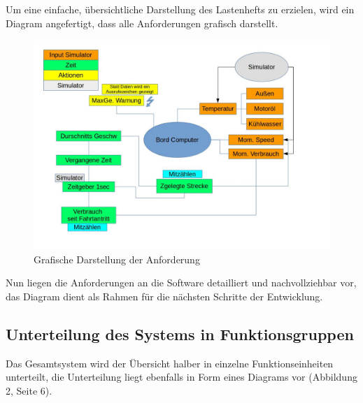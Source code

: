 \documentclass[a4paper,12pt]{article}
\begin{document}
Um eine einfache, übersichtliche Darstellung des Lastenhefts zu erzielen, wird ein Diagram angefertigt, dass alle Anforderungen grafisch darstellt.

\begin{figure}[ht]

\begin{center}
\includegraphics[scale=0.55]{Requirements_v2.jpg}
\caption{Grafische Darstellung der Anforderung}
\end{center}

\end{figure}

Nun liegen die Anforderungen an die Software detailliert und nachvollziehbar vor, das Diagram dient als Rahmen für die nächsten Schritte der Entwicklung.

\subsection{Unterteilung des Systems in Funktionsgruppen}

Das Gesamtsystem wird der Übersicht halber in einzelne Funktionseinheiten unterteilt, die Unterteilung liegt ebenfalls in Form eines Diagrams vor (Abbildung 2, Seite 6).
\end{document}
